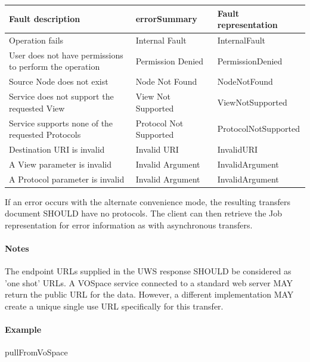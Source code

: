 \documentclass[11pt,a4paper]{ivoa}
\begin{document}
\vspace{3mm}
\begin{tabular}{ p{5cm} l p{4cm} }
\textbf{Fault description} & \textbf{errorSummary} & \textbf{Fault representation} \\
\hline
Operation fails & Internal Fault & InternalFault \\
\hline
User does not have permissions to perform the operation	 & Permission Denied & PermissionDenied \\
\hline
Source Node does not exist & Node Not Found & NodeNotFound \\
\hline
Service does not support the requested View & View Not Supported & ViewNotSupported \\
\hline
Service supports none of the requested Protocols & Protocol Not Supported &ProtocolNotSupported \\
\hline
Destination URI is invalid & Invalid URI & InvalidURI \\
\hline
A View parameter is invalid & Invalid Argument & InvalidArgument \\
\hline
A Protocol parameter is invalid & Invalid Argument & InvalidArgument \\
\hline
\end{tabular}
\vspace{3mm}

If an error occurs with the alternate convenience mode, the resulting transfers document SHOULD have no protocols. The client can then retrieve the Job representation for error information as with asynchronous transfers.

\paragraph{Notes}
The endpoint URLs supplied in the UWS response SHOULD be considered as 'one shot' URLs. A VOSpace service connected to a standard web server MAY return the public URL for the data. However, a different implementation MAY create a unique single use URL specifically for this transfer.

\paragraph{Example}
pullFromVoSpace
\end{document}
